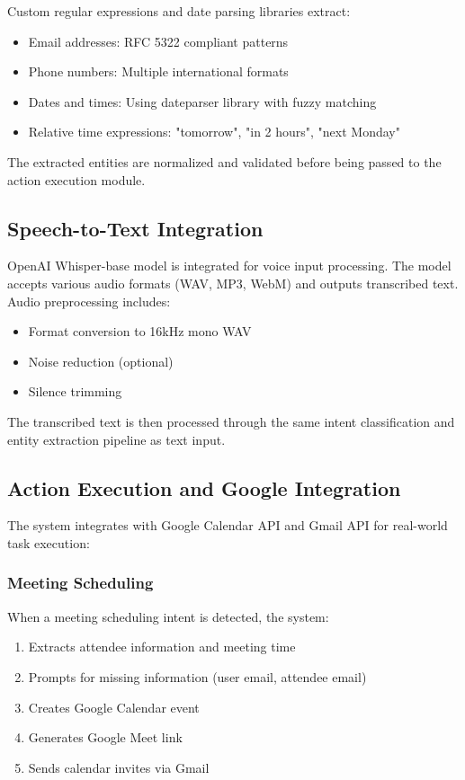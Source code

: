\documentclass[conference]{IEEEtran}
\begin{document}
Custom regular expressions and date parsing libraries extract:
\begin{itemize}
    \item Email addresses: RFC 5322 compliant patterns
    \item Phone numbers: Multiple international formats
    \item Dates and times: Using dateparser library with fuzzy matching
    \item Relative time expressions: "tomorrow", "in 2 hours", "next Monday"
\end{itemize}

The extracted entities are normalized and validated before being passed to the action execution module.

\subsection{Speech-to-Text Integration}

OpenAI Whisper-base model is integrated for voice input processing. The model accepts various audio formats (WAV, MP3, WebM) and outputs transcribed text. Audio preprocessing includes:
\begin{itemize}
    \item Format conversion to 16kHz mono WAV
    \item Noise reduction (optional)
    \item Silence trimming
\end{itemize}

The transcribed text is then processed through the same intent classification and entity extraction pipeline as text input.

\subsection{Action Execution and Google Integration}

The system integrates with Google Calendar API and Gmail API for real-world task execution:

\subsubsection{Meeting Scheduling}

When a meeting scheduling intent is detected, the system:
\begin{enumerate}
    \item Extracts attendee information and meeting time
    \item Prompts for missing information (user email, attendee email)
    \item Creates Google Calendar event
    \item Generates Google Meet link
    \item Sends calendar invites via Gmail
\end{enumerate}
\end{document}
